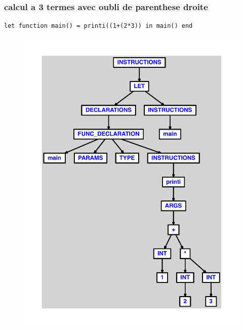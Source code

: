 \documentclass{article}
\begin{document}
\subsubsection{calcul a 3 termes avec oubli de parenthese droite}
\begin{lstlisting}
let function main() = printi((1+(2*3)) in main() end
\end{lstlisting}
\newpage
\begin{figure}[H]
\centering
\includegraphics[max width=\textwidth]{ast/ast_30.pdf}
\end{figure}
\newpage
\end{document}

